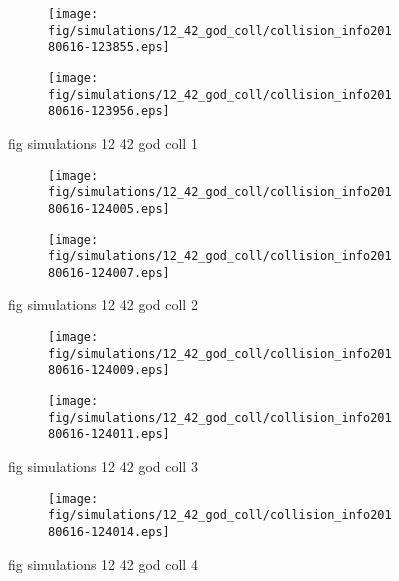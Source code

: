 \begin{figure}[H]
	\centering
	\begin{subfigure}[b]{0.8\textwidth}
		\texttt{[image: fig/simulations/12\_42\_god\_coll/collision\_info20180616-123855.eps]}
		\caption{}
		\label{fig:simulations:12_42_god_coll:collision_info20180616-123855}
	\end{subfigure}

	\begin{subfigure}[b]{0.8\textwidth}
		\texttt{[image: fig/simulations/12\_42\_god\_coll/collision\_info20180616-123956.eps]}
		\caption{}
		\label{fig:simulations:12_42_god_coll:collision_info20180616-123956}
	\end{subfigure}
	\caption{fig simulations 12 42 god coll 1}
	\label{fig:simulations:12_42_god_coll:1}
\end{figure}

\begin{figure}[H]
	\centering
	\begin{subfigure}[b]{0.8\textwidth}
		\texttt{[image: fig/simulations/12\_42\_god\_coll/collision\_info20180616-124005.eps]}
		\caption{}
		\label{fig:simulations:12_42_god_coll:collision_info20180616-124005}
	\end{subfigure}

	\begin{subfigure}[b]{0.8\textwidth}
		\texttt{[image: fig/simulations/12\_42\_god\_coll/collision\_info20180616-124007.eps]}
		\caption{}
		\label{fig:simulations:12_42_god_coll:collision_info20180616-124007}
	\end{subfigure}
	\caption{fig simulations 12 42 god coll 2}
	\label{fig:simulations:12_42_god_coll:2}
\end{figure}

\begin{figure}[H]
	\centering
	\begin{subfigure}[b]{0.8\textwidth}
		\texttt{[image: fig/simulations/12\_42\_god\_coll/collision\_info20180616-124009.eps]}
		\caption{}
		\label{fig:simulations:12_42_god_coll:collision_info20180616-124009}
	\end{subfigure}

	\begin{subfigure}[b]{0.8\textwidth}
		\texttt{[image: fig/simulations/12\_42\_god\_coll/collision\_info20180616-124011.eps]}
		\caption{}
		\label{fig:simulations:12_42_god_coll:collision_info20180616-124011}
	\end{subfigure}
	\caption{fig simulations 12 42 god coll 3}
	\label{fig:simulations:12_42_god_coll:3}
\end{figure}

\begin{figure}[H]
	\centering
	\begin{subfigure}[b]{0.8\textwidth}
		\texttt{[image: fig/simulations/12\_42\_god\_coll/collision\_info20180616-124014.eps]}
		\caption{}
		\label{fig:simulations:12_42_god_coll:collision_info20180616-124014}
	\end{subfigure}
	\caption{fig simulations 12 42 god coll 4}
	\label{fig:simulations:12_42_god_coll:4}
\end{figure}

